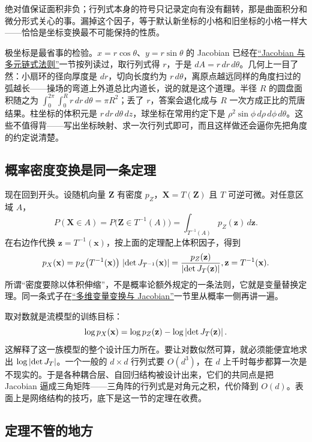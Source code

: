 绝对值保证面积非负；行列式本身的符号只记录定向有没有翻转，那是曲面积分和微分形式关心的事。漏掉这个因子，等于默认新坐标的小格和旧坐标的小格一样大——恰恰是坐标变换最不可能保持的性质。

极坐标是最省事的检验。\(x=r\cos\theta\)、\(y=r\sin\theta\) 的 Jacobian 已经在\hyperref[sec:02-Calculus/06-Multivariable-Calculus/04]{``Jacobian 与多元链式法则''}一节按列读过，取行列式得 \(r\)，于是 \(dA=r\,dr\,d\theta\)。几何上一目了然：小扇环的径向厚度是 \(dr\)，切向长度约为 \(r\,d\theta\)，离原点越远同样的角度扫过的弧越长——操场的弯道上外道总比内道长，说的就是这个道理。半径 \(R\) 的圆盘面积随之为 \(\int_0^{2\pi}\!\int_0^R r\,dr\,d\theta=\pi R^2\)；丢了 \(r\)，答案会退化成与 \(R\) 一次方成正比的荒唐结果。柱坐标的体积元是 \(r\,dr\,d\theta\,dz\)，球坐标在常用约定下是 \(\rho^2\sin\phi\,d\rho\,d\phi\,d\theta\)。这些不值得背——写出坐标映射、求一次行列式即可，而且这样做还会逼你先把角度的约定说清楚。

\subsection{概率密度变换是同一条定理}

现在回到开头。设随机向量 \(\mathbf Z\) 有密度 \(p_Z\)，\(\mathbf X=T(\mathbf Z)\) 且 \(T\) 可逆可微。对任意区域 \(A\)，
\[
P(\mathbf X\in A)=P\bigl(\mathbf Z\in T^{-1}(A)\bigr)
=\int_{T^{-1}(A)}p_Z(\mathbf z)\,d\mathbf z .
\]
在右边作代换 \(\mathbf z=T^{-1}(\mathbf x)\)，按上面的定理配上体积因子，得到
\[
p_X(\mathbf x)=p_Z\bigl(T^{-1}(\mathbf x)\bigr)\,\left|\det J_{T^{-1}}(\mathbf x)\right|
=\frac{p_Z(\mathbf z)}{\left|\det J_T(\mathbf z)\right|},\space \mathbf z=T^{-1}(\mathbf x).
\]
所谓``密度要除以体积伸缩''，不是概率论额外规定的一条法则，它就是变量替换定理。同一条式子在\hyperref[sec:05-Probability/05-Joint-Distributions/05]{``多维变量变换与 Jacobian''}一节里从概率一侧再讲一遍。

取对数就是流模型的训练目标：
\[
\log p_X(\mathbf x)=\log p_Z(\mathbf z)-\log\left|\det J_T(\mathbf z)\right| .
\]
这解释了这一族模型的整个设计压力所在。要让对数似然可算，就必须能便宜地求出 \(\log\left|\det J_T\right|\)。一个一般的 \(d\times d\) 行列式要 \(O(d^3)\)，在 \(d\) 上千时每步都算一次是不现实的。于是各种耦合层、自回归结构被设计出来，它们的共同点是把 Jacobian 逼成三角矩阵——三角阵的行列式是对角元之积，代价降到 \(O(d)\)。表面上是网络结构的技巧，底下是这一节的定理在收费。

\subsection{定理不管的地方}

